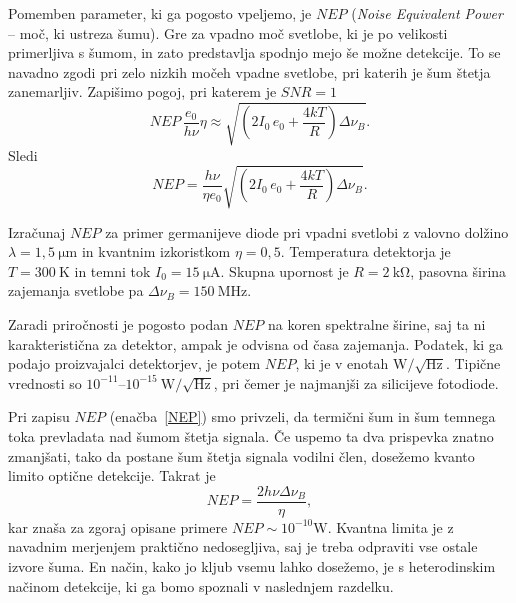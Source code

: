 Pomemben parameter, ki ga pogosto vpeljemo, je $NEP$ ({\it Noise Equivalent Power} -- 
moč, ki ustreza šumu). Gre za vpadno moč svetlobe, ki je po velikosti primerljiva 
s šumom, in zato predstavlja spodnjo mejo še možne detekcije. To se navadno zgodi 
pri zelo nizkih močeh vpadne svetlobe, pri katerih je šum štetja zanemarljiv.
Zapišimo pogoj, pri katerem je $SNR=1$
\begin{equation}
NEP\, \frac{e_0}{h \nu} \eta \approx \sqrt{\left(2 I_0\,e_0
+ \frac{4 kT}{R} \right) \Delta\nu_B}.
\end{equation}
Sledi
\begin{equation}
NEP = \frac{h \nu}{\eta e_0}\sqrt{\left(2 I_0\,e_0
+ \frac{4 kT}{R} \right) \Delta\nu_B}.
\label{NEP}
\end{equation}
\begin{definition}
Izračunaj $NEP$ za primer germanijeve diode pri vpadni svetlobi z valovno dolžino
$\lambda = 1,5~\si{\micro\meter}$ in kvantnim izkoristkom $\eta=0,5$. Temperatura detektorja
je $T=300~\si{\kelvin}$ in temni tok $I_0=15~\si{\micro\ampere}$. Skupna upornost
je $R=2~\si{\kilo\ohm}$, pasovna širina zajemanja svetlobe pa 
$\Delta\nu_B=150~\si{\mega\hertz}$.
\end{definition}

\begin{remark}
Zaradi priročnosti je pogosto podan $NEP$ na koren spektralne širine, saj ta ni 
karakteristična za detektor, ampak je odvisna od časa zajemanja. Podatek, ki 
ga podajo proizvajalci detektorjev, je potem $NEP$, ki je v enotah 
$\si{\watt}/\sqrt{\si{\hertz}}$. Tipične vrednosti so 
$10^{-11}$--$10^{-15}~\si{\watt}/\sqrt{\si{\hertz}}$, pri čemer je najmanjši
za silicijeve fotodiode. 
\end{remark}

Pri zapisu $NEP$ (enačba~\ref{NEP}) smo privzeli, da termični šum in šum temnega
toka prevladata nad šumom štetja signala. Če uspemo ta dva prispevka znatno 
zmanjšati, tako da postane šum štetja signala vodilni člen, 
dosežemo kvanto limito optične detekcije. Takrat je 
\begin{equation}
NEP = \frac{2 h\nu \Delta \nu_B}{\eta},
\end{equation}
kar znaša za zgoraj opisane primere $NEP \sim 10^{-10}\si{\watt}$. Kvantna limita
je z navadnim merjenjem praktično nedosegljiva, saj je treba odpraviti vse ostale izvore 
šuma. En način, kako jo kljub vsemu lahko dosežemo, je s heterodinskim načinom
detekcije, ki ga bomo spoznali v naslednjem razdelku.

